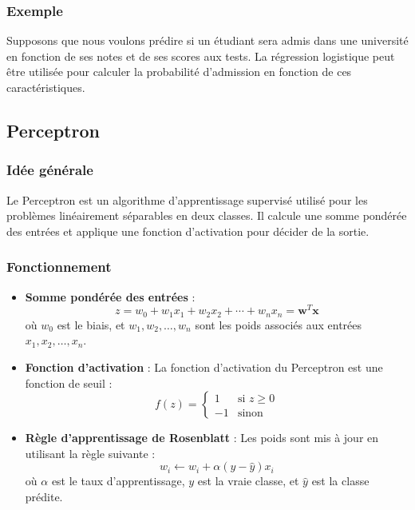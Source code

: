 \documentclass[10pt,a4paper]{article}
\begin{document}
\subsubsection*{Exemple}

Supposons que nous voulons prédire si un étudiant sera admis dans une université en fonction de ses notes et de ses scores aux tests. La régression logistique peut être utilisée pour calculer la probabilité d'admission en fonction de ces caractéristiques.

\subsection*{Perceptron}

\subsubsection*{Idée générale}

Le Perceptron est un algorithme d'apprentissage supervisé utilisé pour les problèmes linéairement séparables en deux classes. Il calcule une somme pondérée des entrées et applique une fonction d'activation pour décider de la sortie.

\subsubsection*{Fonctionnement}

\begin{itemize}
    \item \textbf{Somme pondérée des entrées} :
    \[
    z = w_0 + w_1 x_1 + w_2 x_2 + \cdots + w_n x_n = \mathbf{w}^T \mathbf{x}
    \]
    où \( w_0 \) est le biais, et \( w_1, w_2, \ldots, w_n \) sont les poids associés aux entrées \( x_1, x_2, \ldots, x_n \).

    \item \textbf{Fonction d'activation} :
    La fonction d'activation du Perceptron est une fonction de seuil :
    \[
    f(z) = \begin{cases}
    1 & \text{si } z \geq 0 \\
    -1 & \text{sinon}
    \end{cases}
    \]

    \item \textbf{Règle d'apprentissage de Rosenblatt} :
    Les poids sont mis à jour en utilisant la règle suivante :
    \[
    w_i \leftarrow w_i + \alpha (y - \hat{y}) x_i
    \]
    où \( \alpha \) est le taux d'apprentissage, \( y \) est la vraie classe, et \( \hat{y} \) est la classe prédite.
\end{itemize}
\end{document}
